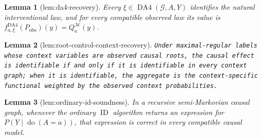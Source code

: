 \documentclass{article}
\newtheorem{lemma}{Lemma}
\begin{document}
\begin{lemma}[lem:da4-recovery]\label{lem:da4-recovery}
Every \(\xi\in\operatorname{DA4}(\mathcal G,A,Y)\) identifies the natural interventional law, and for every compatible observed law its value is \(f^{\mathrm{DA4}}_{a,\xi}(P_{\mathrm{obs}})(y)=Q_a^{\mathcal M}(y)\).
\end{lemma}

\begin{lemma}[lem:root-control-context-recovery]\label{lem:root-control-context-recovery}
\texttt{Under maximal-\allowbreak{}regular labels whose context variables are observed causal roots,\allowbreak{} the causal effect is identifiable if and only if it is identifiable in every context graph;\allowbreak{} when it is identifiable,\allowbreak{} the aggregate is the context-\allowbreak{}specific functional weighted by the observed context probabilities.}
\end{lemma}

\begin{lemma}[lem:ordinary-id-soundness]\label{lem:ordinary-id-soundness}
In a recursive semi-Markovian causal graph, whenever the ordinary \(\operatorname{ID}\) algorithm returns an expression for \(P(Y\mid\operatorname{do}(A=a))\), that expression is correct in every compatible causal model.
\end{lemma}
\end{document}
